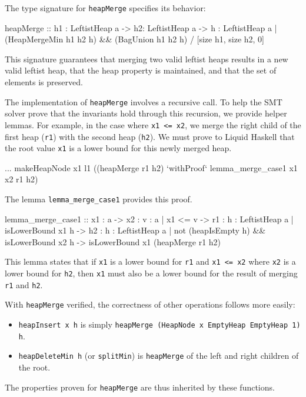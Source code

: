 The type signature for \texttt{heapMerge} specifies its behavior:
\begin{code}
  heapMerge :: h1 : LeftistHeap a 
        -> h2: LeftistHeap a 
        -> {h : LeftistHeap a | (HeapMergeMin h1 h2 h) 
                             && (BagUnion h1 h2 h)}
        / [size h1, size h2, 0]
\end{code}
This signature guarantees that merging two valid leftist heaps results in a new valid leftist heap, that the heap property is maintained, and that the set of elements is preserved.

The implementation of \texttt{heapMerge} involves a recursive call. To help the SMT solver prove that the invariants hold through this recursion, we provide helper lemmas. For example, in the case where \texttt{x1 <= x2}, we merge the right child of the first heap (\texttt{r1}) with the second heap (\texttt{h2}). We must prove to Liquid Haskell that the root value \texttt{x1} is a lower bound for this newly merged heap.
\begin{code}
... makeHeapNode x1 l1 ((heapMerge r1 h2) 
    `withProof` lemma_merge_case1 x1 x2 r1 h2)
\end{code}
The lemma \texttt{lemma\_merge\_case1} provides this proof.
\begin{code}
  lemma_merge_case1 :: x1 : a  
        -> x2 : { v : a |  x1  <= v}
        -> r1 : {h : LeftistHeap a | isLowerBound x1 h} 
        -> h2 : {h : LeftistHeap a | not (heapIsEmpty h) 
                                  && isLowerBound x2 h}  
        -> {isLowerBound x1 (heapMerge r1 h2)}
\end{code}
This lemma states that if \texttt{x1} is a lower bound for \texttt{r1} and \texttt{x1 <= x2} where \texttt{x2} is a lower bound for \texttt{h2}, then \texttt{x1} must also be a lower bound for the result of merging \texttt{r1} and \texttt{h2}.

With \texttt{heapMerge} verified, the correctness of other operations follows more easily:
\begin{itemize}
    \item \texttt{heapInsert x h} is simply \texttt{heapMerge (HeapNode x EmptyHeap EmptyHeap 1) h}.
    \item \texttt{heapDeleteMin h} (or \texttt{splitMin}) is \texttt{heapMerge} of the left and right children of the root.
\end{itemize}
The properties proven for \texttt{heapMerge} are thus inherited by these functions.

